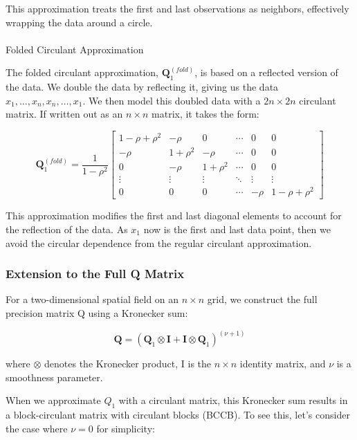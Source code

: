 \documentclass[journal=,manuscript=]{achemso}
\makeatletter
\let\oldparagraph\paragraph
\renewcommand{\paragraph}{
    \@ifstar
      \xxxParagraphStar
      \xxxParagraphNoStar
  }
\newcommand{\xxxParagraphStar}[1]{\oldparagraph*{#1}\mbox{}}
\newcommand{\xxxParagraphNoStar}[1]{\oldparagraph{#1}\mbox{}}
\makeatother
\begin{document}
This approximation treats the first and last observations as neighbors,
effectively wrapping the data around a circle.

\paragraph{Folded Circulant
Approximation}\label{folded-circulant-approximation}

The folded circulant approximation, \(\mathbf{Q}_1^{(fold)}\), is based
on a reflected version of the data. We double the data by reflecting it,
giving us the data \(x_1,  \dots, x_n, x_n, \dots, x_1\). We then model
this doubled data with a \(2n \times 2n\) circulant matrix. If written
out as an \(n \times n\) matrix, it takes the form:

\[
\mathbf{Q}_1^{(fold)} = \frac{1}{1-\rho^2}
\begin{bmatrix}
1-\rho+\rho^2 & -\rho & 0 & \cdots & 0 & 0 \\
-\rho & 1+\rho^2 & -\rho & \cdots & 0 & 0 \\
0 & -\rho & 1+\rho^2 & \cdots & 0 & 0 \\
\vdots & \vdots & \vdots & \ddots & \vdots & \vdots \\
0 & 0 & 0 & \cdots & -\rho & 1-\rho+\rho^2
\end{bmatrix}
\]

This approximation modifies the first and last diagonal elements to
account for the reflection of the data. As \(x_1\) now is the first and
last data point, then we avoid the circular dependence from the regular
circulant approximation.

\subsubsection{Extension to the Full Q
Matrix}\label{extension-to-the-full-q-matrix}

For a two-dimensional spatial field on an \(n \times n\) grid, we
construct the full precision matrix Q using a Kronecker sum:

\[
\mathbf{Q} = (\mathbf{Q}_1 \otimes \mathbf{I} + \mathbf{I} \otimes \mathbf{Q}_1)^{(\nu + 1)}
\]

where \(\otimes\) denotes the Kronecker product, I is the \(n \times n\)
identity matrix, and \(\nu\) is a smoothness parameter.

When we approximate \(Q_1\) with a circulant matrix, this Kronecker sum
results in a block-circulant matrix with circulant blocks (BCCB). To see
this, let's consider the case where \(\nu = 0\) for simplicity:
\end{document}
